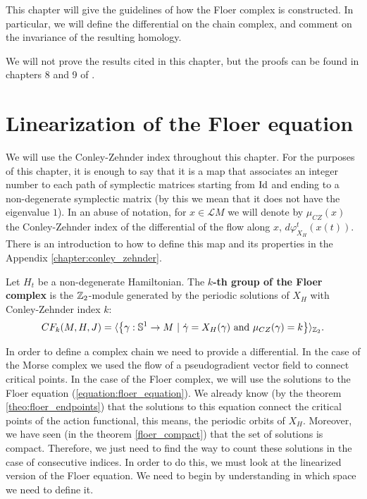 This chapter will give the guidelines of how the Floer complex is constructed. In particular, we will define the differential on the chain complex, and comment on the invariance of the resulting homology.

We will not prove the results cited in this chapter, but the proofs can be found in chapters 8 and 9 of \cite{audin2014morse}.

\section{Linearization of the Floer equation}

We will use the Conley-Zehnder index throughout this chapter. For the purposes of this chapter, it is enough to say that it is a map that associates an integer number to each path of symplectic matrices starting from $\mathrm{Id}$ and ending to a non-degenerate symplectic matrix (by this we mean that it does not have the eigenvalue $1$). In an abuse of notation, for $x \in \mathcal{L}M$ we will denote by $\mu_{CZ}(x)$ the Conley-Zehnder index of the differential of the flow along $x$, $d\varphi_{X_H}^t(x(t))$. There is an introduction to how to define this map and its properties in the Appendix \ref{chapter:conley_zehnder}.

\begin{deff} \label{deff:floer_complex}
Let $H_t$ be a non-degenerate Hamiltonian. The {\bf $k$-th group of the Floer complex} is the $\mathbb{Z}_2$-module generated by the periodic solutions of $X_H$ with Conley-Zehnder index $k$:
\[CF_k(M,H,J) = \langle \left\{ \gamma : \mathbb{S}^1 \rightarrow M \ | \ \dot{\gamma} = X_H(\gamma) \text{ and } \mu_{CZ}(\gamma) = k \right\} \rangle_{\mathbb{Z}_2} .\]
\end{deff}

In order to define a complex chain we need to provide a differential. In the case of the Morse complex we used the flow of a pseudogradient vector field to connect critical points. In the case of the Floer complex, we will use the solutions to the Floer equation (\ref{equation:floer_equation}). We already know (by the theorem \ref{theo:floer_endpoints}) that the solutions to this equation connect the critical points of the action functional, this means, the periodic orbits of $X_H$. Moreover, we have seen (in the theorem \ref{floer_compact}) that the set of solutions is compact. Therefore, we just need to find the way to count these solutions in the case of consecutive indices. In order to do this, we must look at the linearized version of the Floer equation. We need to begin by understanding in which space we need to define it.

